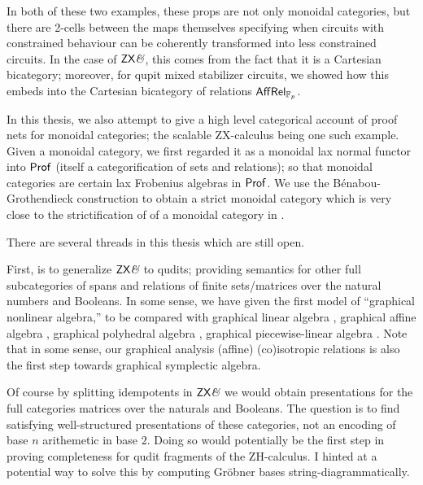 In both of these two examples, these props are not only monoidal categories, but there are 2-cells between the maps themselves specifying when circuits with constrained behaviour can be coherently transformed into less constrained circuits.  In the case of $\mathsf{ZX}\textit{\&}$, this comes from the fact that it is a Cartesian bicategory; moreover, for qupit mixed stabilizer circuits, we showed how this embeds into the Cartesian bicategory of relations $\mathsf{Aff}\mathsf{Rel}_{\mathbb{F}_p}$.

In this thesis, we also attempt to give a high level categorical account of proof nets for monoidal categories; the scalable ZX-calculus being one such example.  Given a monoidal category, we first  regarded it as a monoidal lax normal functor into ${\sf Prof}$ (itself a categorification of sets and relations); so that monoidal categories are certain lax Frobenius algebras in ${\sf Prof}$. We use the B\'enabou-Grothendieck construction to obtain a strict monoidal category which is very close to the strictification of of a monoidal category in \cite{wilson}.  


There are several threads in this thesis which are still open.

First, is to generalize $\mathsf{ZX}\textit{\&}$ to qudits; providing semantics for other full subcategories of spans and relations of finite sets/matrices over the natural numbers and Booleans. In some sense, we have given the first model of  ``graphical nonlinear algebra,'' to be compared with graphical linear algebra \cite{ih}, graphical affine algebra \cite{affine}, graphical polyhedral algebra \cite{dpa}, graphical piecewise-linear algebra \cite{dpla}.  Note that in some sense, our graphical analysis (affine) (co)isotropic relations is also the first step towards graphical symplectic algebra.


Of course by splitting idempotents  in $\mathsf{ZX}\textit{\&}$ we would obtain presentations for the full categories  matrices over the naturals and Booleans.  The question is to find satisfying well-structured presentations of these categories, not an encoding of base $n$ arithemetic in base $2$.  Doing so would potentially be the first step in proving completeness for qudit fragments of the ZH-calculus.  I hinted at a potential way to solve this by computing Gr\"obner bases string-diagrammatically.  

